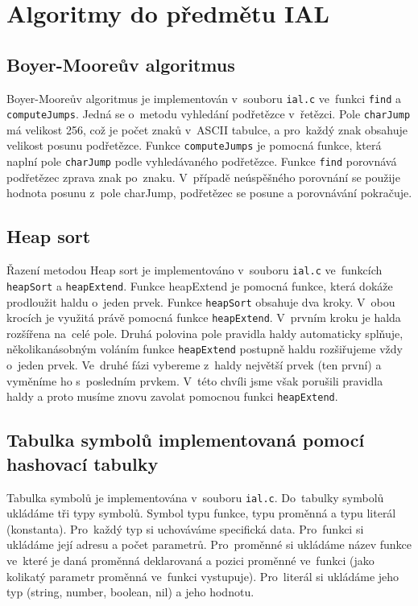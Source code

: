 \documentclass[12pt,a4paper,titlepage,final]{article}
\begin{document}
\section{Algoritmy do předmětu IAL}

\subsection{Boyer-Mooreův algoritmus}
Boyer-Mooreův algoritmus je implementován v~souboru \texttt{ial.c} ve~funkci
\texttt{find} a \texttt{computeJumps}. Jedná se o~metodu vyhledání podřetězce v~řetězci.
Pole \texttt{charJump} má velikost 256, což je počet znaků v~ASCII tabulce, a pro~každý
znak obsahuje velikost posunu podřetězce. Funkce \texttt{computeJumps} je pomocná funkce,
která naplní pole \texttt{charJump} podle vyhledávaného podřetězce. Funkce \texttt{find}
porovnává podřetězec zprava znak po~znaku. V~případě neúspěšného porovnání se použije
hodnota posunu z~pole charJump, podřetězec se posune a porovnávání pokračuje.

\subsection{Heap sort}
Řazení metodou Heap sort je implementováno v~souboru \texttt{ial.c} ve~funkcích
\texttt{heapSort} a \texttt{heap\-Extend}. Funkce heapExtend je pomocná funkce, která dokáže
prodloužit haldu o~jeden prvek. Funkce \texttt{heapSort} obsahuje dva kroky. V~obou
krocích je využitá právě pomocná funkce \texttt{heapExtend}. V~prvním kroku je halda
rozšířena na~celé pole. Druhá polovina pole pravidla haldy automaticky splňuje,
několikanásobným voláním funkce \texttt{heapExtend} postupně haldu rozšiřujeme
vždy o~jeden prvek. Ve~druhé fázi vybereme z~haldy největší prvek (ten první)
a vyměníme ho s~posledním prvkem. V~této chvíli jsme však porušili pravidla
haldy a proto musíme znovu zavolat pomocnou funkci \texttt{heapExtend}.

\subsection{Tabulka symbolů implementovaná pomocí hashovací tabulky}
Tabulka symbolů je implementována v~souboru \texttt{ial.c}. Do~tabulky symbolů ukládáme tři
typy symbolů. Symbol typu funkce, typu proměnná a typu literál (konstanta). Pro~každý
typ si uchováváme specifická data. Pro~funkci si ukládáme její adresu a počet
parametrů. Pro~proměnné si ukládáme název funkce ve~které je daná proměnná
deklarovaná a pozici proměnné ve~funkci (jako kolikatý parametr proměnná ve~funkci
vystupuje). Pro~literál si ukládáme jeho typ (string, number, boolean, nil) a jeho hodnotu.
\end{document}
